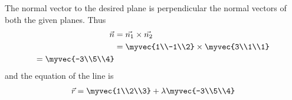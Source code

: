 The normal vector to the desired plane is perpendicular the normal vectors of both the given planes. Thus
\begin{align}
\vec{n}&=\vec{n_1} \times \vec{n_2}
\\
&=\myvec{1\\-1\\2} \times \myvec{3\\1\\1}\\=\myvec{-3\\5\\4}
\end{align}
and the equation of the line is
\begin{align}
\vec{r}=\myvec{1\\2\\3}+\lambda \myvec{-3\\5\\4}   
\end{align}